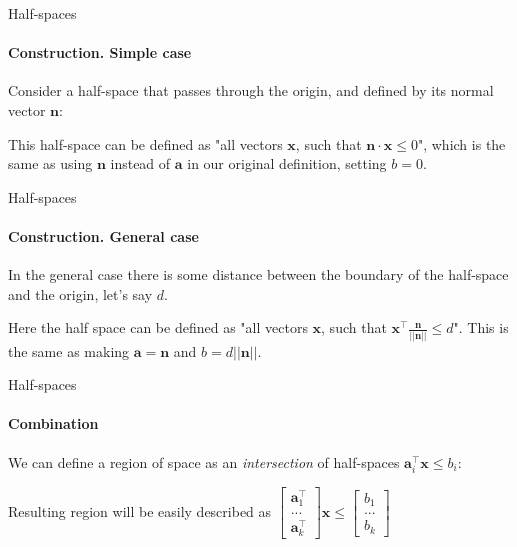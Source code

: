 \documentclass{beamer}
\begin{document}
\begin{frame}{Half-spaces}
\framesubtitle{Construction. Simple case}
\begin{flushleft}

Consider a half-space that passes through the origin, and defined by its normal vector $\mathbf{n}$:



This half-space can be defined as "all vectors $\mathbf{x}$, such that $\mathbf{n} \cdot \mathbf{x} \leq 0$", which is the same as using $\mathbf{n}$ instead of $\mathbf{a}$ in our original definition, setting $b = 0$.
 
\end{flushleft}
\end{frame}




\begin{frame}{Half-spaces}
\framesubtitle{Construction. General case}
\begin{flushleft}

In the general case there is some distance between the boundary of the half-space and the origin, let's say $d$.


%
Here the half space can be defined as "all vectors $\mathbf{x}$, such that $\mathbf{x}^\top \frac{\mathbf{n}}{|| \mathbf{n} ||}  \leq d$". This is the same as making $\mathbf{a} = \mathbf{n}$ and $b = d ||\mathbf{n}||$.
 
\end{flushleft}
\end{frame}



\begin{frame}{Half-spaces}
\framesubtitle{Combination}
\begin{flushleft}

We can define a region of space as an \emph{intersection} of half-spaces $\mathbf{a}_i^\top \mathbf{x} \leq b_i$:



Resulting region will be easily described as $\begin{bmatrix} \mathbf{a}_1^\top \\ ... \\ \mathbf{a}_k^\top \end{bmatrix} \mathbf{x} \leq \begin{bmatrix} b_1 \\ ... \\ b_k \end{bmatrix}$

 
\end{flushleft}
\end{frame}
\end{document}
